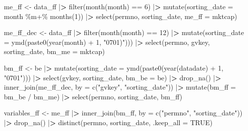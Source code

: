 \documentclass[
]{book}
\newenvironment{Shaded}{\begin{snugshade}}{\end{snugshade}}
\newcommand{\AttributeTok}[1]{\textcolor[rgb]{0.61,0.61,0.61}{#1}}
\newcommand{\ConstantTok}[1]{\textcolor[rgb]{0,0,0}{#1}}
\newcommand{\DecValTok}[1]{\textcolor[rgb]{0.06,0.06,0.06}{#1}}
\newcommand{\ErrorTok}[1]{\textcolor[rgb]{0.14,0.14,0.14}{\textbf{#1}}}
\newcommand{\FunctionTok}[1]{\textcolor[rgb]{0,0,0}{#1}}
\newcommand{\NormalTok}[1]{#1}
\newcommand{\OtherTok}[1]{\textcolor[rgb]{0.37,0.37,0.37}{#1}}
\newcommand{\SpecialCharTok}[1]{\textcolor[rgb]{0,0,0}{#1}}
\newcommand{\StringTok}[1]{\textcolor[rgb]{0.5,0.5,0.5}{#1}}
\begin{document}
\begin{Shaded}
\begin{Highlighting}[]
\NormalTok{me\_ff }\OtherTok{\textless{}{-}}\NormalTok{ data\_ff }\SpecialCharTok{|}\ErrorTok{\textgreater{}}
  \FunctionTok{filter}\NormalTok{(}\FunctionTok{month}\NormalTok{(month) }\SpecialCharTok{==} \DecValTok{6}\NormalTok{) }\SpecialCharTok{|}\ErrorTok{\textgreater{}}
  \FunctionTok{mutate}\NormalTok{(}\AttributeTok{sorting\_date =}\NormalTok{ month }\SpecialCharTok{\%m+\%} \FunctionTok{months}\NormalTok{(}\DecValTok{1}\NormalTok{)) }\SpecialCharTok{|}\ErrorTok{\textgreater{}}
  \FunctionTok{select}\NormalTok{(permno, sorting\_date, }\AttributeTok{me\_ff =}\NormalTok{ mktcap)}

\NormalTok{me\_ff\_dec }\OtherTok{\textless{}{-}}\NormalTok{ data\_ff }\SpecialCharTok{|}\ErrorTok{\textgreater{}}
  \FunctionTok{filter}\NormalTok{(}\FunctionTok{month}\NormalTok{(month) }\SpecialCharTok{==} \DecValTok{12}\NormalTok{) }\SpecialCharTok{|}\ErrorTok{\textgreater{}}
  \FunctionTok{mutate}\NormalTok{(}\AttributeTok{sorting\_date =} \FunctionTok{ymd}\NormalTok{(}\FunctionTok{paste0}\NormalTok{(}\FunctionTok{year}\NormalTok{(month) }\SpecialCharTok{+} \DecValTok{1}\NormalTok{, }\StringTok{"0701)"}\NormalTok{))) }\SpecialCharTok{|}\ErrorTok{\textgreater{}}
  \FunctionTok{select}\NormalTok{(permno, gvkey, sorting\_date, }\AttributeTok{bm\_me =}\NormalTok{ mktcap)}

\NormalTok{bm\_ff }\OtherTok{\textless{}{-}}\NormalTok{ be }\SpecialCharTok{|}\ErrorTok{\textgreater{}}
  \FunctionTok{mutate}\NormalTok{(}\AttributeTok{sorting\_date =} \FunctionTok{ymd}\NormalTok{(}\FunctionTok{paste0}\NormalTok{(}\FunctionTok{year}\NormalTok{(datadate) }\SpecialCharTok{+} \DecValTok{1}\NormalTok{, }\StringTok{"0701"}\NormalTok{))) }\SpecialCharTok{|}\ErrorTok{\textgreater{}}
  \FunctionTok{select}\NormalTok{(gvkey, sorting\_date, }\AttributeTok{bm\_be =}\NormalTok{ be) }\SpecialCharTok{|}\ErrorTok{\textgreater{}}
  \FunctionTok{drop\_na}\NormalTok{() }\SpecialCharTok{|}\ErrorTok{\textgreater{}}
  \FunctionTok{inner\_join}\NormalTok{(me\_ff\_dec, }\AttributeTok{by =} \FunctionTok{c}\NormalTok{(}\StringTok{"gvkey"}\NormalTok{, }\StringTok{"sorting\_date"}\NormalTok{)) }\SpecialCharTok{|}\ErrorTok{\textgreater{}}
  \FunctionTok{mutate}\NormalTok{(}\AttributeTok{bm\_ff =}\NormalTok{ bm\_be }\SpecialCharTok{/}\NormalTok{ bm\_me) }\SpecialCharTok{|}\ErrorTok{\textgreater{}}
  \FunctionTok{select}\NormalTok{(permno, sorting\_date, bm\_ff)}

\NormalTok{variables\_ff }\OtherTok{\textless{}{-}}\NormalTok{ me\_ff }\SpecialCharTok{|}\ErrorTok{\textgreater{}}
  \FunctionTok{inner\_join}\NormalTok{(bm\_ff, }\AttributeTok{by =} \FunctionTok{c}\NormalTok{(}\StringTok{"permno"}\NormalTok{, }\StringTok{"sorting\_date"}\NormalTok{)) }\SpecialCharTok{|}\ErrorTok{\textgreater{}}
  \FunctionTok{drop\_na}\NormalTok{() }\SpecialCharTok{|}\ErrorTok{\textgreater{}}
  \FunctionTok{distinct}\NormalTok{(permno, sorting\_date, }\AttributeTok{.keep\_all =} \ConstantTok{TRUE}\NormalTok{)}
\end{Highlighting}
\end{Shaded}
\end{document}
